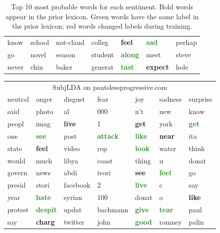 \documentclass{article}
\begin{document}
\begin{table}
\begin{tabular}{ l l l l l l l  }
know & school & not-claud & colleg & \textcolor{BrickRed}{\textbf{feel}} & \textcolor{ForestGreen}{\textbf{sad}} & perhap \\
go & novel & season & student & \textcolor{ForestGreen}{\textbf{along}} & meet & steve \\
never & chin & baker & generat & \textcolor{ForestGreen}{\textbf{tast}} & \textcolor{BrickRed}{\textbf{expect}} & hole \\
\end{tabular}
\caption{Top 10 most probable words for each sentiment. Bold words
appear in the prior lexicon. Green words have the same label in the
prior lexicon; red words changed labels during training.\label{tab:words}}
\end{table}

\begin{table} \label{tab:pantsless}
\centering
\begin{tabular}{ l l l l l l l  }
\multicolumn{7}{c}{ \sc SubjLDA on pantslessprogressive.com }\\
\sc neutral & \sc anger & \sc disgust & \sc fear & \sc joy & \sc sadness & \sc surprise \\
\hline
said & photo & al & 000 & n't & new & know \\
peopl & imag & \textcolor{BrickRed}{\textbf{live}} & 1 & \textcolor{BrickRed}{\textbf{get}} & york & \textcolor{ForestGreen}{\textbf{get}} \\
one & \textcolor{ForestGreen}{\textbf{see}} & post & \textcolor{ForestGreen}{\textbf{attack}} & \textcolor{ForestGreen}{\textbf{like}} & \textcolor{BrickRed}{\textbf{near}} & ita \\
state & \textcolor{BrickRed}{\textbf{feel}} & video & rep & \textcolor{ForestGreen}{\textbf{look}} & water & think \\
would & much & libya & coast & thing & u & donat \\
govern & news & abdi & ivori & \textcolor{BrickRed}{\textbf{see}} & \textcolor{ForestGreen}{\textbf{feel}} & go \\
presid & stori & facebook & 2 & \textcolor{ForestGreen}{\textbf{live}} & c & say \\
year & \textcolor{ForestGreen}{\textbf{hate}} & syrian & 100 & donat & o & \textcolor{BrickRed}{\textbf{like}} \\
protest & \textcolor{ForestGreen}{\textbf{despit}} & updat & bachmann & \textcolor{ForestGreen}{\textbf{give}} & \textcolor{ForestGreen}{\textbf{tear}} & paul \\
say & \textcolor{BrickRed}{\textbf{charg}} & twitter & john & \textcolor{ForestGreen}{\textbf{good}} & romney & palin \\

\end{tabular}
\end{table}
\end{document}
